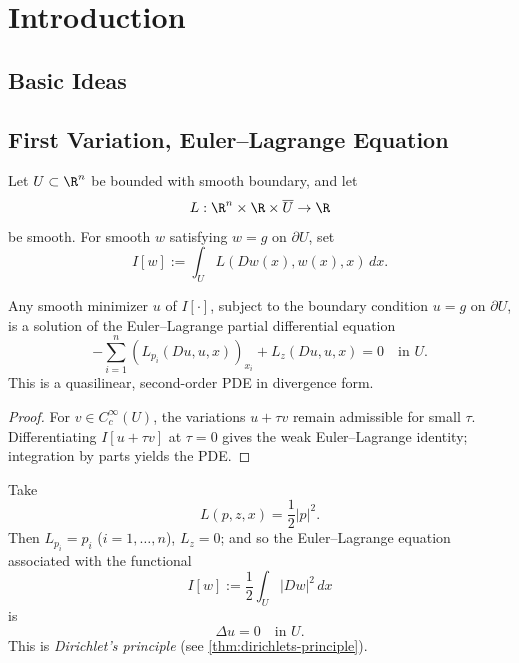 
\section{Introduction}
\label{sec:calculus-of-variations-introduction}

\subsection{Basic Ideas}
\label{sec:basic-ideas-calculus-of-variations}

\subsection{First Variation, Euler--Lagrange Equation}
\label{sec:first-variation-euler-lagrange}

Let $U\subset\R^n$ be bounded with smooth boundary, and let
\[
L:\R^n\times\R\times\overline U\to\R
\]
be smooth. For smooth $w$ satisfying $w=g$ on $\partial U$, set
\[
I[w]:=\int_U L(Dw(x),w(x),x)\,dx.
\tag{4}
\]

\begin{theorem}
\label{thm:euler-lagrange-equation-pde-minimizer}
Any smooth minimizer $u$ of $I[\cdot]$, subject to the boundary condition $u = g$ on $\partial U$, is a solution of the Euler--Lagrange partial differential equation
\[
-\sum_{i=1}^{n}(L_{p_i}(Du, u, x))_{x_i} + L_z(Du, u, x) = 0 \quad \text{in } U.
\]
This is a quasilinear, second-order PDE in divergence form.
\end{theorem}

\begin{proof}
\sketch For $v\in C_c^\infty(U)$, the variations $u+\tau v$ remain admissible for small $\tau$. Differentiating $I[u+\tau v]$ at $\tau=0$ gives the weak Euler--Lagrange identity; integration by parts yields the PDE.
\end{proof}

\begin{example}
\label{ex:dirichlets-principle-calculus-of-variations}
Take
\[
L(p, z, x) = \frac{1}{2}|p|^2.
\]
Then $L_{p_i} = p_i$ ($i = 1, \ldots, n$), $L_z = 0$; and so the Euler--Lagrange equation associated with the functional
\[
I[w] := \frac{1}{2}\int_U |Dw|^2 \, dx
\]
is
\[
\Delta u = 0 \quad \text{in } U.
\]
This is \textit{Dirichlet's principle} (see \cref{thm:dirichlets-principle}).
\end{example}


